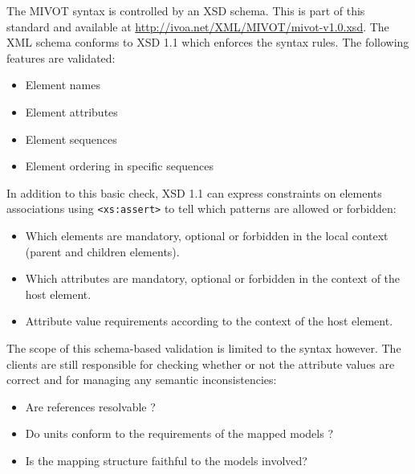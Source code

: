The MIVOT syntax is controlled by an XSD schema.
This is part of this standard and available at \url{http://ivoa.net/XML/MIVOT/mivot-v1.0.xsd}.
The XML schema conforms to XSD 1.1 \citep{std:xsd1.1} which enforces the syntax rules. 
The following features are validated:

\begin{itemize} 
  \item Element names 
  \item Element attributes
  \item Element sequences 
  \item Element ordering in specific sequences
\end{itemize}

In addition to this basic check, XSD 1.1 can express constraints on elements associations using \texttt{<xs:assert>} to tell which patterns are allowed or forbidden:

\begin{itemize} 
  \item Which elements are mandatory, optional  or forbidden in the local context (parent and children elements).
  \item Which attributes are mandatory, optional  or forbidden in the context of the host element.
  \item Attribute value requirements according to the context of the host element.

\end{itemize}
 
The scope of this schema-based validation is limited to the syntax however. 
The clients are still responsible for checking whether or not the attribute values are correct and for managing any semantic inconsistencies:

\begin{itemize} 
  \item Are references resolvable ? %
  \item Do units conform to the requirements of the mapped models ?
  \item Is the mapping structure faithful to the %
  models involved?
\end{itemize}


